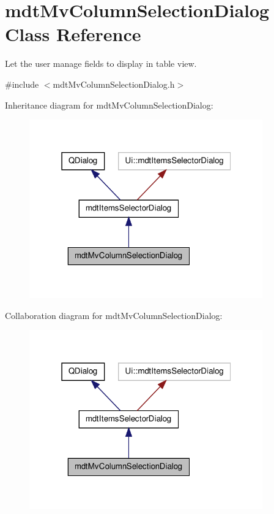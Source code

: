 \hypertarget{classmdt_mv_column_selection_dialog}{\section{mdt\-Mv\-Column\-Selection\-Dialog Class Reference}
\label{classmdt_mv_column_selection_dialog}
}


Let the user manage fields to display in table view.  




{\ttfamily \#include $<$mdt\-Mv\-Column\-Selection\-Dialog.\-h$>$}



Inheritance diagram for mdt\-Mv\-Column\-Selection\-Dialog\-:\nopagebreak
\begin{figure}[H]
\begin{center}
\leavevmode
\includegraphics[width=286pt]{classmdt_mv_column_selection_dialog__inherit__graph}
\end{center}
\end{figure}


Collaboration diagram for mdt\-Mv\-Column\-Selection\-Dialog\-:\nopagebreak
\begin{figure}[H]
\begin{center}
\leavevmode
\includegraphics[width=286pt]{classmdt_mv_column_selection_dialog__coll__graph}
\end{center}
\end{figure}
